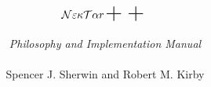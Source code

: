 \textheight	 8in
\textwidth	 5.5in

\newcommand{\nektar}{{\boldmath ${\cal N}\varepsilon \kappa {\cal T}\alpha r$}}

\topmargin       0.0in

\makeindex
%




\title{\LARGE \bf \nektar$++$}

\author{{\em Philosophy and Implementation Manual} \\ \\
Spencer J. Sherwin and Robert M. Kirby}



\date{}

\maketitle
\newpage
\pagestyle{plain}



%
\tableofcontents
%

\pagestyle{headings}

 














